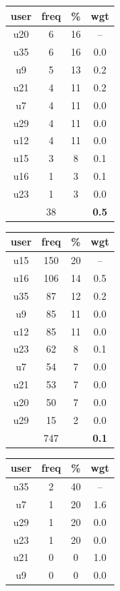 \begin{table}
\centering
\begin{tabular}{ |c|c|c|c| }
	\hline
	\textbf{user} & \textbf{freq} & \textbf{\%} & \textbf{wgt} \\
	\hline
	u20 & 6 & 16 & -- \\
	u35 & 6 & 16 & 0.0 \\
	u9 & 5 & 13 & 0.2 \\
	u21 & 4 & 11 & 0.2 \\
	u7 & 4 & 11 & 0.0 \\
	u29 & 4 & 11 & 0.0 \\
	u12 & 4 & 11 & 0.0 \\
	u15 & 3 & 8 & 0.1 \\
	u16 & 1 & 3 & 0.1 \\
	u23 & 1 & 3 & 0.0 \\
	 & 38 & & \textbf{0.5} \\
	\hline
\end{tabular}
\begin{tabular}{ |c|c|c|c| }
	\hline
	\textbf{user} & \textbf{freq} & \textbf{\%} & \textbf{wgt} \\
	\hline
	u15 & 150 & 20 & -- \\
	u16 & 106 & 14 & 0.5 \\
	u35 & 87 & 12 & 0.2 \\
	u9 & 85 & 11 & 0.0 \\
	u12 & 85 & 11 & 0.0 \\
	u23 & 62 & 8 & 0.1 \\
	u7 & 54 & 7 & 0.0 \\
	u21 & 53 & 7 & 0.0 \\
	u20 & 50 & 7 & 0.0 \\
	u29 & 15 & 2 & 0.0 \\
	 & 747 & & \textbf{0.1} \\
	\hline
\end{tabular}
\begin{tabular}{ |c|c|c|c| }
	\hline
	\textbf{user} & \textbf{freq} & \textbf{\%} & \textbf{wgt} \\
	\hline
	u35 & 2 & 40 & -- \\
	u7 & 1 & 20 & 1.6 \\
	u29 & 1 & 20 & 0.0 \\
	u23 & 1 & 20 & 0.0 \\
	u21 & 0 & 0 & 1.0 \\
	u9 & 0 & 0 & 0.0 \\

\end{tabular}
\end{table}
